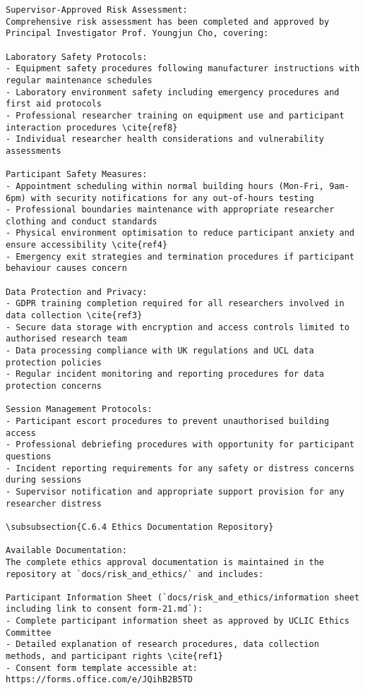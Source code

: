 \begin{verbatim}
Supervisor-Approved Risk Assessment:
Comprehensive risk assessment has been completed and approved by Principal Investigator Prof. Youngjun Cho, covering:

Laboratory Safety Protocols:
- Equipment safety procedures following manufacturer instructions with regular maintenance schedules
- Laboratory environment safety including emergency procedures and first aid protocols
- Professional researcher training on equipment use and participant interaction procedures \cite{ref8}
- Individual researcher health considerations and vulnerability assessments

Participant Safety Measures:
- Appointment scheduling within normal building hours (Mon-Fri, 9am-6pm) with security notifications for any out-of-hours testing
- Professional boundaries maintenance with appropriate researcher clothing and conduct standards
- Physical environment optimisation to reduce participant anxiety and ensure accessibility \cite{ref4}
- Emergency exit strategies and termination procedures if participant behaviour causes concern

Data Protection and Privacy:
- GDPR training completion required for all researchers involved in data collection \cite{ref3}
- Secure data storage with encryption and access controls limited to authorised research team
- Data processing compliance with UK regulations and UCL data protection policies
- Regular incident monitoring and reporting procedures for data protection concerns

Session Management Protocols:
- Participant escort procedures to prevent unauthorised building access
- Professional debriefing procedures with opportunity for participant questions
- Incident reporting requirements for any safety or distress concerns during sessions
- Supervisor notification and appropriate support provision for any researcher distress

\subsubsection{C.6.4 Ethics Documentation Repository}

Available Documentation:
The complete ethics approval documentation is maintained in the repository at `docs/risk_and_ethics/` and includes:

Participant Information Sheet (`docs/risk_and_ethics/information sheet including link to consent form-21.md`):
- Complete participant information sheet as approved by UCLIC Ethics Committee
- Detailed explanation of research procedures, data collection methods, and participant rights \cite{ref1}
- Consent form template accessible at: https://forms.office.com/e/JQihB2B5TD


\end{verbatim}
